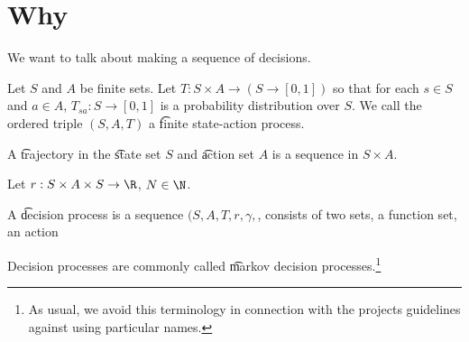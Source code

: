 

\section*{Why}

We want to talk about making a sequence of decisions.


Let $S$ and $A$ be finite sets.
Let $T: S \times  A \to (S \to [0, 1])$ so that for each $s \in S$ and $a \in A$, $T_{sa}: S \to [0, 1]$ is a probability distribution over $S$.
We call the ordered triple $(S, A, T)$ a \t{finite state-action process}.

A \t{trajectory} in the \t{state set} $S$ and \t{action set} $A$ is a sequence in $S \times  A$.

Let $r: S \times  A \times  S \to \R $, $N \in \N  $.

A \t{decision process} is a sequence $(S, A, T, r, \gamma , $, consists of two sets, a function set, an action

Decision processes are commonly called \t{markov decision processes}.\footnote{As usual, we avoid this terminology in connection with the projects guidelines against using particular names.}

\blankpage
